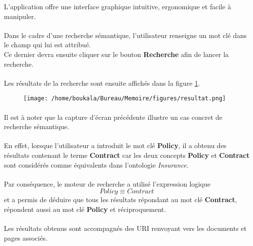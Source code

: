 \documentclass[12pt, a4paper, oneside]{book}
\begin{document}
L'application offre une interface graphique intuitive, ergonomique et facile à manipuler.

\paragraph{}
Dans le cadre d'une recherche sémantique, l'utilisateur renseigne un mot clé dans le champ qui lui est attribué.\\
Ce dernier devra ensuite cliquer sur le bouton \textbf{Recherche} afin de lancer la recherche.

\paragraph{}
Les résultats de la recherche sont ensuite affichés dans la figure \ref{resultat}. 

\begin{figure}[h!]
\begin{center}
\texttt{[image: /home/boukala/Bureau/Memoire/figures/resultat.png]}
\label{resultat}
\end{center}
\end{figure}

\paragraph{}
Il est à noter que la capture d'écran précédente illustre un cas concret de recherche sémantique.

\paragraph{}
En effet, lorsque l'utilisateur a introduit le mot clé \textbf{Policy}, il a obtenu des résultats contenant le terme \textbf{Contract} car les deux concepts \textbf{Policy} et \textbf{Contract} sont considérés comme équivalents dans l'ontologie \emph{Insurance}.

\paragraph{}
Par conséquence, le moteur de recherche a utilisé l'expression logique $$Policy \equiv Contract$$
et a permis de déduire que tous les résultats répondant au mot clé \textbf{Contract}, répondent aussi au mot clé \textbf{Policy} et réciproquement.

\paragraph{}
Les résultats obtenus sont accompagnés des URI renvoyant vers les documents et pages associés.
\end{document}
